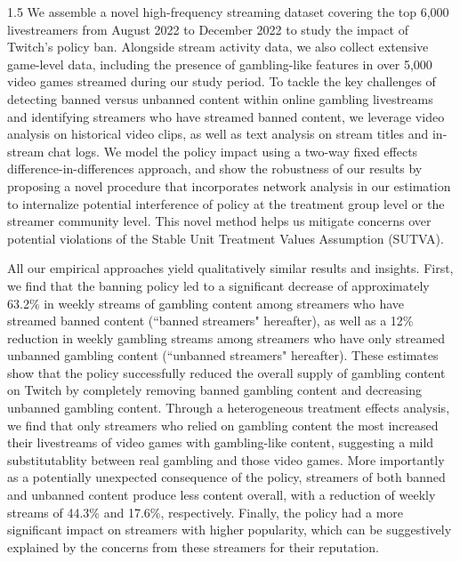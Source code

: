 \documentclass[a4paper,12pt]{article}
\begin{document}
\begin{spacing}{1.5}
We assemble a novel high-frequency streaming dataset covering the top 6,000 livestreamers from August 2022 to December 2022 to study the impact of Twitch's policy ban. Alongside stream activity data, we also collect extensive game-level data, including the presence of gambling-like features in over 5,000 video games streamed during our study period. To tackle the key challenges of detecting banned versus unbanned content within online gambling livestreams and identifying streamers who have streamed banned content, we leverage video analysis on historical video clips, as well as text analysis on stream titles and in-stream chat logs. We model the policy impact using a two-way fixed effects difference-in-differences approach, and show the robustness of our results by proposing a novel procedure that incorporates network analysis in our estimation to internalize potential interference of policy at the treatment group level or the streamer community level. This novel method helps us mitigate concerns over potential violations of the Stable Unit Treatment Values Assumption (SUTVA).

All our empirical approaches yield qualitatively similar results and insights. First, we find that the banning policy led to a significant decrease of approximately 63.2\% in weekly streams of gambling content among streamers who have streamed banned content (``banned streamers" hereafter), as well as a 12\% reduction in weekly gambling streams among streamers who have only streamed unbanned gambling content (``unbanned streamers" hereafter). These estimates show that the policy successfully reduced the overall supply of gambling content on Twitch by completely removing banned gambling content and decreasing unbanned gambling content. Through a heterogeneous treatment effects analysis, we find that only streamers who relied on gambling content the most increased their livestreams of video games with gambling-like content, suggesting a mild substitutablity between real gambling and those video games. More importantly as a potentially unexpected consequence of the policy, streamers of both banned and unbanned content produce less content overall, with a reduction of weekly streams of 44.3\% and 17.6\%, respectively. Finally, the policy had a more significant impact on streamers with higher popularity, which can be suggestively explained by the concerns from these streamers for their reputation.


\end{spacing}
\end{document}
